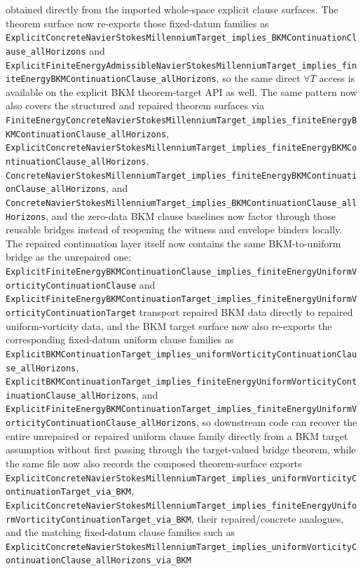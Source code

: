 \documentclass[11pt]{article}
\begin{document}
obtained directly from the imported whole-space explicit clause surfaces.
The theorem surface now re-exports those fixed-datum families as
\texttt{ExplicitConcreteNavierStokesMillenniumTarget\_implies\_BKMContinuationClause\_allHorizons}
and
\texttt{ExplicitFiniteEnergyAdmissibleNavierStokesMillenniumTarget\_implies\_finiteEnergyBKMContinuationClause\_allHorizons},
so the same direct $\forall T$ access is available on the explicit BKM
theorem-target API as well.  The same pattern now also covers the structured
and repaired theorem surfaces via
\texttt{FiniteEnergyConcreteNavierStokesMillenniumTarget\_implies\_finiteEnergyBKMContinuationClause\_allHorizons},
\texttt{ExplicitConcreteNavierStokesMillenniumTarget\_implies\_finiteEnergyBKMContinuationClause\_allHorizons},
\texttt{ConcreteNavierStokesMillenniumTarget\_implies\_finiteEnergyBKMContinuationClause\_allHorizons},
and
\texttt{ConcreteNavierStokesMillenniumTarget\_implies\_BKMContinuationClause\_allHorizons},
and
the zero-data BKM clause baselines now factor through those reusable bridges
instead of reopening the witness and envelope binders locally.
The repaired continuation layer itself now contains the same BKM-to-uniform
bridge as the unrepaired one:
\texttt{ExplicitFiniteEnergyBKMContinuationClause\_implies\_finiteEnergyUniformVorticityContinuationClause}
and
\texttt{ExplicitFiniteEnergyBKMContinuationTarget\_implies\_finiteEnergyUniformVorticityContinuationTarget}
transport repaired BKM data directly to repaired uniform-vorticity data,
and the BKM target surface now also re-exports the corresponding fixed-datum
uniform clause families as
\texttt{ExplicitBKMContinuationTarget\_implies\_uniformVorticityContinuationClause\_allHorizons},
\texttt{ExplicitBKMContinuationTarget\_implies\_finiteEnergyUniformVorticityContinuationClause\_allHorizons},
and
\texttt{ExplicitFiniteEnergyBKMContinuationTarget\_implies\_finiteEnergyUniformVorticityContinuationClause\_allHorizons},
so downstream code can recover the entire unrepaired or repaired uniform clause
family directly from a BKM target assumption without first passing through the
target-valued bridge theorem,
while the same file now also records the composed theorem-surface exports
\texttt{ExplicitConcreteNavierStokesMillenniumTarget\_implies\_uniformVorticityContinuationTarget\_via\_BKM},
\texttt{ExplicitConcreteNavierStokesMillenniumTarget\_implies\_finiteEnergyUniformVorticityContinuationTarget\_via\_BKM},
their repaired/concrete analogues, and the matching fixed-datum clause families
such as
\texttt{ExplicitConcreteNavierStokesMillenniumTarget\_implies\_uniformVorticityContinuationClause\_allHorizons\_via\_BKM}
\end{document}

